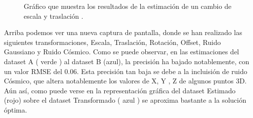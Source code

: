 \begin{figure}
\begin{center}
\hspace{0.5cm}

\end{center}

\caption{Gráfico que muestra los resultados de la estimación de un cambio de escala y traslación .}
\end{figure}

Arriba podemos ver una nueva captura de pantalla, donde se han realizado las siguientes transformaciones, Escala, Traslación, Rotación, Offset, Ruido Gaussiano y Ruido Cósmico.
Como se puede observar, en las estimaciones del dataset A ( verde ) al dataset B (azul), la precisión ha bajado notablemente, con un valor RMSE del 0.06.
Esta precisión tan baja se debe a la incluisión de ruido Cósmico, que altera notablemente los valores de X, Y , Z  de algunos puntos 3D.
Aún así, como puede verse en  la representación gráfica del dataset Estimado (rojo) sobre el dataset Transformado ( azul ) se aproxima bastante a la solución óptima.



